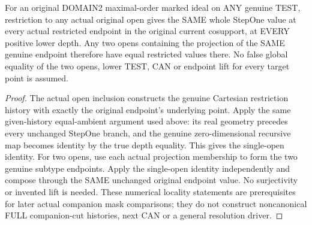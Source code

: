 \begin{theorem}
\label{hir:original-bound-two-stepone-open-values}
\leanok
For an original DOMAIN2 maximal-order marked ideal on ANY genuine TEST,
restriction to any actual original open gives the SAME whole StepOne
value at every actual restricted endpoint in the original current
cosupport, at EVERY positive lower depth. Any two opens containing the
projection of the SAME genuine endpoint therefore have equal restricted
values there. No false global equality of the two opens, lower TEST,
CAN or endpoint lift for every target point is assumed.
\end{theorem}
\begin{proof}
The actual open inclusion constructs the genuine Cartesian restriction
history with exactly the original endpoint's underlying point. Apply the
same given-history equal-ambient argument used above: its real geometry
precedes every unchanged StepOne branch, and the genuine zero-dimensional
recursive map becomes identity by the true depth equality. This gives the
single-open identity. For two opens, use each actual projection membership
to form the two genuine subtype endpoints. Apply the single-open identity
independently and compose through the SAME unchanged original endpoint
value. No surjectivity or invented lift is needed. These numerical
locality statements are prerequisites for later actual companion mask
comparisons; they do not construct noncanonical FULL companion-cut
histories, next CAN or a general resolution driver.
\end{proof}
